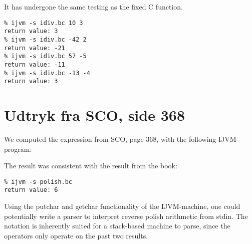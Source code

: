 \documentclass[12pt,a4paper]{article}
\begin{document}
\lstset{language=JVMIS}


It has undergone the same testing as the fixed C function.

\lstset{language=sh,numbers=none}
\begin{lstlisting}
% ijvm -s idiv.bc 10 3
return value: 3
% ijvm -s idiv.bc -42 2
return value: -21
% ijvm -s idiv.bc 57 -5
return value: -11
% ijvm -s idiv.bc -13 -4
return value: 3
\end{lstlisting}

\section{Udtryk fra SCO, side 368}
We computed the expression from SCO, page 368, with the following IJVM-program:
\lstset{language=JVMIS}


The result was consistent with the result from the book:
\lstset{language=sh,numbers=none}
\begin{lstlisting}
% ijvm -s polish.bc
return value: 6
\end{lstlisting}

Using the putchar and getchar functionality of the IJVM-machine, one could potentially write a parser to interpret reverse polish arithmetic from stdin.
The notation is inherently suited for a stack-based machine to parse, since the operators only operate on the past two results.
\end{document}
